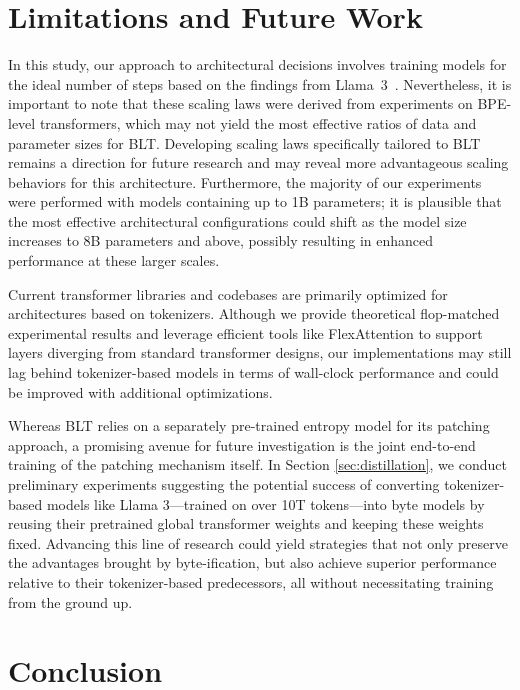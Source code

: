 \section{Limitations and Future Work}

In this study, our approach to architectural decisions involves training models for the ideal number of steps based on the findings from Llama~3~\citep{dubey2024llama}. Nevertheless, it is important to note that these scaling laws were derived from experiments on BPE-level transformers, which may not yield the most effective ratios of data and parameter sizes for {\textsc BLT}. Developing scaling laws specifically tailored to {\textsc BLT} remains a direction for future research and may reveal more advantageous scaling behaviors for this architecture. Furthermore, the majority of our experiments were performed with models containing up to 1B parameters; it is plausible that the most effective architectural configurations could shift as the model size increases to 8B parameters and above, possibly resulting in enhanced performance at these larger scales.

Current transformer libraries and codebases are primarily optimized for architectures based on tokenizers. Although we provide theoretical flop-matched experimental results and leverage efficient tools like FlexAttention to support layers diverging from standard transformer designs, our implementations may still lag behind tokenizer-based models in terms of wall-clock performance and could be improved with additional optimizations.

Whereas {\textsc BLT} relies on a separately pre-trained entropy model for its patching approach, a promising avenue for future investigation is the joint end-to-end training of the patching mechanism itself. In Section \ref{sec:distillation}, we conduct preliminary experiments suggesting the potential success of converting tokenizer-based models like Llama 3—trained on over 10T tokens—into byte models by reusing their pretrained global transformer weights and keeping these weights fixed. Advancing this line of research could yield strategies that not only preserve the advantages brought by byte-ification, but also achieve superior performance relative to their tokenizer-based predecessors, all without necessitating training from the ground up.

\section{Conclusion}
\label{section:conclusion}

